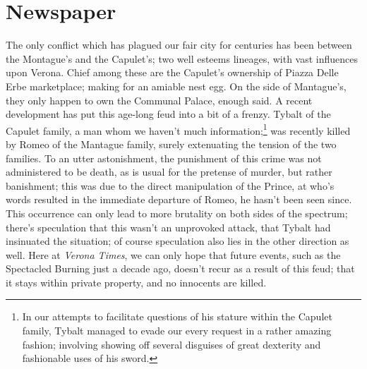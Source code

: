 \documentclass{article}
\begin{document}
\section{Newspaper}
\vspace{0.5in}
{
\date{February 19, 1598}
\maketitle

\setlength{\columnsep}{15pt}
\begin{multicols}{3}
    The only conflict which has plagued our fair city for centuries has been between the Montague's and the Capulet's; two well esteems lineages, with vast influences upon Verona. 
    Chief among these are the Capulet's ownership of Piazza Delle Erbe marketplace; making for an amiable nest egg. 
    On the side of Mantague's, they only happen to own the Communal Palace, enough said.
    A recent development has put this age-long feud into a bit of a frenzy.
    Tybalt of the Capulet family, a man whom we haven't much information;\footnote{
        In our attempts to facilitate questions of his stature within the Capulet family, Tybalt managed to evade our every request in a rather amazing fashion; involving showing off several disguises of great dexterity and fashionable uses of his sword.}
        was recently killed by Romeo of the Mantague family, surely extenuating the tension of the two families.
    To an utter astonishment, the punishment of this crime was not administered to be death, as is usual for the pretense of murder, but rather banishment;
        this was due to the direct manipulation of the Prince, at who's words resulted in the immediate departure of Romeo, he hasn't been seen since.
    This occurrence can only lead to more brutality on both sides of the spectrum; there's speculation that this wasn't an unprovoked attack, that Tybalt had insinuated the situation; of course speculation also lies in the other direction as well.
    Here at \textit{Verona Times}, we can only hope that future events, such as the Spectacled Burning just a decade ago, doesn't recur as a result of this feud; that it stays within private property, and no innocents are killed.
    \closearticle


\end{multicols}}
\end{document}
